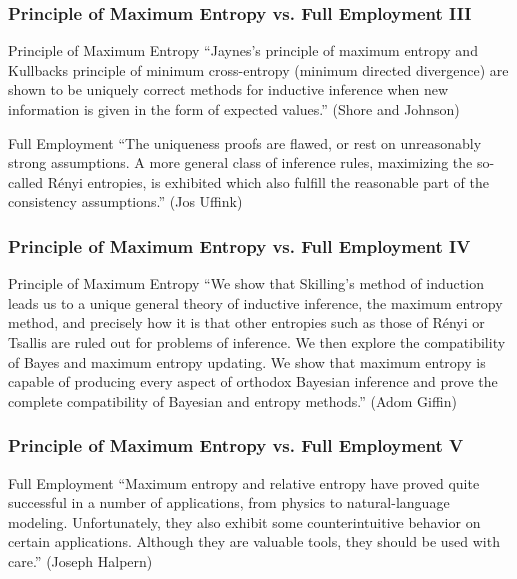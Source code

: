 \documentclass[xcolor=dvipsnames]{beamer}
\begin{document}
\begin{frame}
  \frametitle{Principle of Maximum Entropy vs. Full Employment III}
  \begin{block}{Principle of Maximum Entropy}
    ``Jaynes's principle of maximum entropy and Kullbacks
    principle of minimum cross-entropy (minimum directed
    divergence) are shown to be uniquely correct methods for
    inductive inference when new information is given in the form
    of expected values.'' \linebreak (Shore and Johnson)
  \end{block}
  \begin{block}{Full Employment}
    ``The uniqueness proofs are flawed, or rest on unreasonably
    strong assumptions. A more general class of inference rules,
    maximizing the so-called R{\'e}nyi entropies, is exhibited
    which also fulfill the reasonable part of the consistency
    assumptions.'' (Jos Uffink)
  \end{block}
\end{frame}

\begin{frame}
  \frametitle{Principle of Maximum Entropy vs. Full Employment IV}
  \begin{block}{Principle of Maximum Entropy}
    ``We show that Skilling's method of induction leads us to a
    unique general theory of inductive inference, the maximum
    entropy method, and precisely how it is that other entropies
    such as those of R{\'e}nyi or Tsallis are ruled out for
    problems of inference. We then explore the compatibility of
    Bayes and maximum entropy updating. We show that maximum
    entropy is capable of producing every aspect of orthodox
    Bayesian inference and prove the complete compatibility of
    Bayesian and entropy methods.'' (Adom Giffin)
 \end{block}
\end{frame}

\begin{frame}
  \frametitle{Principle of Maximum Entropy vs. Full Employment V}
\begin{block}{Full Employment}
  ``Maximum entropy and relative entropy have proved quite
  successful in a number of applications, from physics to
  natural-language modeling. Unfortunately, they also exhibit some
  counterintuitive behavior on certain applications. Although they
  are valuable tools, they should be used with care.'' \linebreak
  (Joseph Halpern)
\end{block}
\end{frame}
\end{document}
